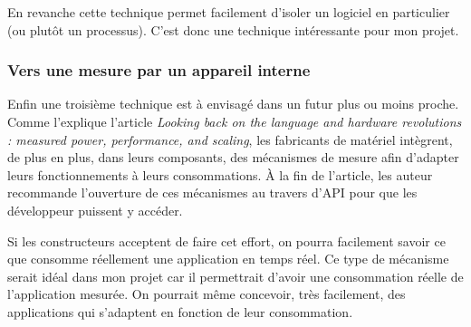 \documentclass[a4paper, 11pt]{report}
\begin{document}
En revanche cette technique permet facilement d'isoler un logiciel en particulier (ou plutôt un processus). C'est donc une technique intéressante pour mon projet.

			\subsubsection{Vers une mesure par un appareil interne}
Enfin une troisième technique est à envisagé dans un futur plus ou moins proche. Comme l'explique l'article \textit{Looking back on the language and hardware revolutions
: measured power, performance, and scaling}\cite{Esmaeilzadeh:2011:LBL:1950365.1950402}, les fabricants de matériel intègrent, de plus en plus, dans leurs composants, des mécanismes de mesure afin d'adapter leurs fonctionnements à leurs consommations. À la fin de l'article, les auteur recommande l'ouverture de ces mécanismes au travers d'API pour que les développeur puissent y accéder.

Si les constructeurs acceptent de faire cet effort, on pourra facilement savoir ce que consomme réellement une application en temps réel. Ce type de mécanisme serait idéal dans mon projet car il permettrait d'avoir une consommation réelle de l'application mesurée. On pourrait même concevoir, très facilement, des applications qui s'adaptent en fonction de leur consommation.



		
\end{document}
